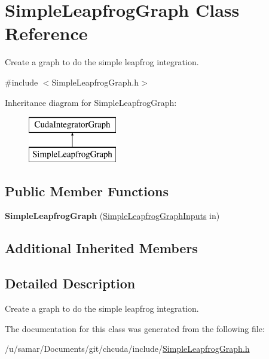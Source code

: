 \hypertarget{classSimpleLeapfrogGraph}{}\section{Simple\+Leapfrog\+Graph Class Reference}
\label{classSimpleLeapfrogGraph}


Create a graph to do the simple leapfrog integration.  




{\ttfamily \#include $<$Simple\+Leapfrog\+Graph.\+h$>$}

Inheritance diagram for Simple\+Leapfrog\+Graph\+:\begin{figure}[H]
\begin{center}
\leavevmode
\includegraphics[height=2.000000cm]{classSimpleLeapfrogGraph}
\end{center}
\end{figure}
\subsection*{Public Member Functions}
\begin{DoxyCompactItemize}
\item 
\hypertarget{classSimpleLeapfrogGraph_a7cb32aee82e9d3d809b792e3f59cdcf1}{}\label{classSimpleLeapfrogGraph_a7cb32aee82e9d3d809b792e3f59cdcf1} 
{\bfseries Simple\+Leapfrog\+Graph} (\hyperlink{structSimpleLeapfrogGraphInputs}{Simple\+Leapfrog\+Graph\+Inputs} in)
\end{DoxyCompactItemize}
\subsection*{Additional Inherited Members}


\subsection{Detailed Description}
Create a graph to do the simple leapfrog integration. 



The documentation for this class was generated from the following file\+:\begin{DoxyCompactItemize}
\item 
/u/samar/\+Documents/git/chcuda/include/\hyperlink{SimpleLeapfrogGraph_8h}{Simple\+Leapfrog\+Graph.\+h}\end{DoxyCompactItemize}
